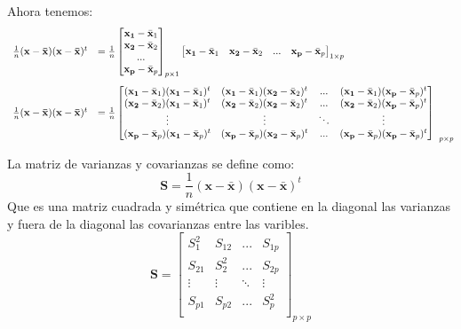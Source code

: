 \documentclass[12pt,letterpaper]{report} %
\begin{document}
Ahora tenemos:
$$
\begin{array}{rl}\vspace{3 mm}
\frac{1}{n}(\mathbf{x-\bar{x}})(\mathbf{x-\bar{x}})^t & = \frac{1}{n}
\begin{bmatrix}
\mathbf{x_{1}}-\bar{\mathbf{x}}_{1}\\ \mathbf{x_{2}}-\bar{\mathbf{x}}_{2}\\ ... \\ \mathbf{x_{p}}-\bar{\mathbf{x}}_{p}
\end{bmatrix}_{p\times 1}
\begin{bmatrix}
\mathbf{x_{1}}-\bar{\mathbf{x}}_{1} & \mathbf{x_{2}}-\bar{\mathbf{x}}_{2} & ... & \mathbf{x_{p}}-\bar{\mathbf{x}}_{p}
\end{bmatrix}_{1\times p}\\
\frac{1}{n}(\mathbf{x-\bar{x}})(\mathbf{x-\bar{x}})^t & = \frac{1}{n}
\begin{bmatrix}
(\mathbf{x_{1}}-\bar{\mathbf{x}}_{1})(\mathbf{x_{1}}-\bar{\mathbf{x}}_{1})^t & (\mathbf{x_{1}}-\bar{\mathbf{x}}_{1})(\mathbf{x_{2}}-\bar{\mathbf{x}}_{2})^t & ... & (\mathbf{x_{1}}-\bar{\mathbf{x}}_{1})(\mathbf{x_{p}}-\bar{\mathbf{x}}_{p})^t\\
(\mathbf{x_{2}}-\bar{\mathbf{x}}_{2})(\mathbf{x_{1}}-\bar{\mathbf{x}}_{1})^t & (\mathbf{x_{2}}-\bar{\mathbf{x}}_{2})(\mathbf{x_{2}}-\bar{\mathbf{x}}_{2})^t & ... & (\mathbf{x_{2}}-\bar{\mathbf{x}}_{2})(\mathbf{x_{p}}-\bar{\mathbf{x}}_{p})^t\\
\vdots & \vdots & \ddots  & \vdots\\
(\mathbf{x_{p}}-\bar{\mathbf{x}}_{p})(\mathbf{x_{1}}-\bar{\mathbf{x}}_{p})^t & (\mathbf{x_{p}}-\bar{\mathbf{x}}_{p})(\mathbf{x_{2}}-\bar{\mathbf{x}}_{p})^t & ... & (\mathbf{x_{p}}-\bar{\mathbf{x}}_{p})(\mathbf{x_{p}}-\bar{\mathbf{x}}_{p})^t\\
\end{bmatrix}
\end{array}_{p\times p}
$$

La matriz de varianzas y covarianzas se define como:
$$\mathbf{S}=\frac{1}{n} (\mathbf{x-\bar{x}})(\mathbf{x-\bar{x}})^t$$
Que es una matriz cuadrada y simétrica que contiene en la diagonal las varianzas y fuera de la diagonal las covarianzas entre las varibles.
$$
\mathbf{S}=\begin{bmatrix}
S_{1}^2 & S_{12} & ... & S_{1p} \\
S_{21} & S_{2}^2 & ... & S_{2p} \\
\vdots & \vdots &  \ddots & \vdots \\
S_{p1} & S_{p2} & ... & S_{p}^2 \\
\end{bmatrix}_{p\times p}
$$
\end{document}
